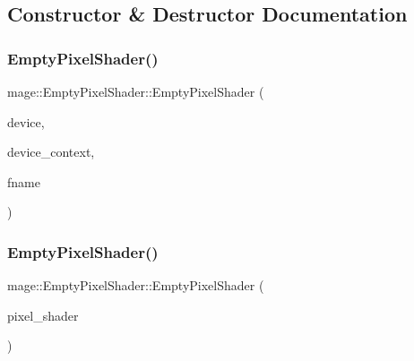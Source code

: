 \subsection{Constructor \& Destructor Documentation}
\hypertarget{classmage_1_1_empty_pixel_shader_a7ef10491614de6eaa31d7845094d34a1}{}\label{classmage_1_1_empty_pixel_shader_a7ef10491614de6eaa31d7845094d34a1} 
\subsubsection{\texorpdfstring{Empty\+Pixel\+Shader()}{EmptyPixelShader()}\hspace{0.1cm}{\footnotesize\ttfamily [1/3]}}
{\footnotesize\ttfamily mage\+::\+Empty\+Pixel\+Shader\+::\+Empty\+Pixel\+Shader (\begin{DoxyParamCaption}\item[{I\+D3\+D11\+Device2 $\ast$}]{device,  }\item[{I\+D3\+D11\+Device\+Context2 $\ast$}]{device\+\_\+context,  }\item[{const wstring \&}]{fname }\end{DoxyParamCaption})\hspace{0.3cm}{\ttfamily [explicit]}}

\hypertarget{classmage_1_1_empty_pixel_shader_a5eaa8370d531fcc7877cc706bc8fbcce}{}\label{classmage_1_1_empty_pixel_shader_a5eaa8370d531fcc7877cc706bc8fbcce} 
\subsubsection{\texorpdfstring{Empty\+Pixel\+Shader()}{EmptyPixelShader()}\hspace{0.1cm}{\footnotesize\ttfamily [2/3]}}
{\footnotesize\ttfamily mage\+::\+Empty\+Pixel\+Shader\+::\+Empty\+Pixel\+Shader (\begin{DoxyParamCaption}\item[{const \hyperlink{classmage_1_1_empty_pixel_shader}{Empty\+Pixel\+Shader} \&}]{pixel\+\_\+shader }\end{DoxyParamCaption})\hspace{0.3cm}{\ttfamily [delete]}}

